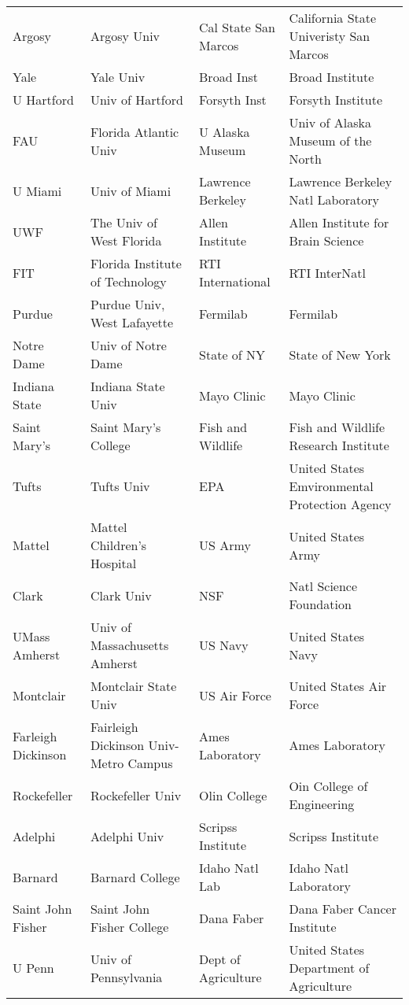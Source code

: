 \documentclass[12pt]{article} %
\begin{document}
\begin{table}[ht]
\begin{adjustwidth}{-2cm}{}
\begin{tabular}{llll}
  Argosy & Argosy Univ & Cal State San Marcos & California State Univeristy San Marcos \\
  Yale & Yale Univ & Broad Inst & Broad Institute \\
  U Hartford & Univ of Hartford & Forsyth Inst & Forsyth Institute \\
  FAU & Florida Atlantic Univ & U Alaska Museum & Univ of Alaska Museum of the North \\
  U Miami & Univ of Miami & Lawrence Berkeley & Lawrence Berkeley Natl Laboratory \\
  UWF & The Univ of West Florida & Allen Institute & Allen Institute for Brain Science \\
  FIT & Florida Institute of Technology & RTI International & RTI InterNatl \\
  Purdue & Purdue Univ, West Lafayette & Fermilab & Fermilab \\
  Notre Dame & Univ of Notre Dame & State of NY & State of New York \\
  Indiana State & Indiana State Univ & Mayo Clinic & Mayo Clinic \\
  Saint Mary's & Saint Mary's College & Fish and Wildlife & Fish and Wildlife Research Institute \\
  Tufts & Tufts Univ & EPA & United States Emvironmental Protection Agency \\
  Mattel & Mattel Children's Hospital & US Army & United States Army \\
  Clark & Clark Univ & NSF & Natl Science Foundation \\
  UMass Amherst & Univ of Massachusetts Amherst & US Navy & United States Navy \\
  Montclair & Montclair State Univ & US Air Force & United States Air Force \\
  Farleigh Dickinson & Fairleigh Dickinson Univ-Metro Campus & Ames Laboratory & Ames Laboratory \\
  Rockefeller & Rockefeller Univ & Olin College & Oin College of Engineering \\
  Adelphi & Adelphi Univ & Scripss Institute & Scripss Institute \\
  Barnard & Barnard College & Idaho Natl Lab & Idaho Natl Laboratory \\
  Saint John Fisher & Saint John Fisher College & Dana Faber & Dana Faber Cancer Institute \\
  U Penn & Univ of Pennsylvania & Dept of Agriculture & United States Department of Agriculture \\

\end{tabular}
\end{adjustwidth}
\end{table}
\end{document}
